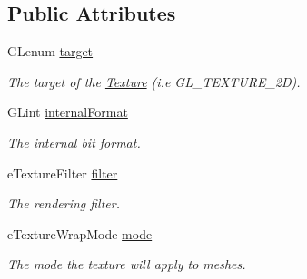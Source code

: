 \subsection*{Public Attributes}
\begin{DoxyCompactItemize}
\item 
G\+Lenum \hyperlink{structsparky_1_1_s_p_a_r_k_y___t_e_x_t_u_r_e___d_e_s_c_aa16d4a1609584eecae520984f0c844fa}{target}\hypertarget{structsparky_1_1_s_p_a_r_k_y___t_e_x_t_u_r_e___d_e_s_c_aa16d4a1609584eecae520984f0c844fa}{}\label{structsparky_1_1_s_p_a_r_k_y___t_e_x_t_u_r_e___d_e_s_c_aa16d4a1609584eecae520984f0c844fa}

\begin{DoxyCompactList}\small\item\em The target of the \hyperlink{classsparky_1_1_texture}{Texture} (i.\+e G\+L\+\_\+\+T\+E\+X\+T\+U\+R\+E\+\_\+2D). \end{DoxyCompactList}\item 
G\+Lint \hyperlink{structsparky_1_1_s_p_a_r_k_y___t_e_x_t_u_r_e___d_e_s_c_a41118481a1e1ebbae3ff6909d583112a}{internal\+Format}\hypertarget{structsparky_1_1_s_p_a_r_k_y___t_e_x_t_u_r_e___d_e_s_c_a41118481a1e1ebbae3ff6909d583112a}{}\label{structsparky_1_1_s_p_a_r_k_y___t_e_x_t_u_r_e___d_e_s_c_a41118481a1e1ebbae3ff6909d583112a}

\begin{DoxyCompactList}\small\item\em The internal bit format. \end{DoxyCompactList}\item 
e\+Texture\+Filter \hyperlink{structsparky_1_1_s_p_a_r_k_y___t_e_x_t_u_r_e___d_e_s_c_a578a5137068a9f9bb9a672931928ae04}{filter}\hypertarget{structsparky_1_1_s_p_a_r_k_y___t_e_x_t_u_r_e___d_e_s_c_a578a5137068a9f9bb9a672931928ae04}{}\label{structsparky_1_1_s_p_a_r_k_y___t_e_x_t_u_r_e___d_e_s_c_a578a5137068a9f9bb9a672931928ae04}

\begin{DoxyCompactList}\small\item\em The rendering filter. \end{DoxyCompactList}\item 
e\+Texture\+Wrap\+Mode \hyperlink{structsparky_1_1_s_p_a_r_k_y___t_e_x_t_u_r_e___d_e_s_c_a9b527f02b0469a529c146bcf14574dcb}{mode}\hypertarget{structsparky_1_1_s_p_a_r_k_y___t_e_x_t_u_r_e___d_e_s_c_a9b527f02b0469a529c146bcf14574dcb}{}\label{structsparky_1_1_s_p_a_r_k_y___t_e_x_t_u_r_e___d_e_s_c_a9b527f02b0469a529c146bcf14574dcb}

\begin{DoxyCompactList}\small\item\em The mode the texture will apply to meshes. \end{DoxyCompactList}\end{DoxyCompactItemize}


